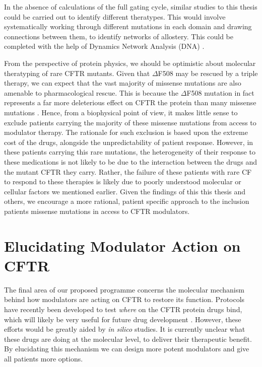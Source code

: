 In the absence of calculations of the full gating cycle, similar studies to this thesis could be carried out to identify different theratypes. This would involve systematically working through different mutations in each domain and drawing connections between them, to identify networks of allostery. This could be completed with the help of Dynamics Network Analysis (DNA) \cite{melo2020}. 

From the perspective of protein physics, we should be optimistic about molecular theratyping of rare CFTR mutants. Given that $\Delta$F508 may be rescued by a triple therapy, we can expect that the vast majority of missense mutations are also amenable to pharmacological rescue. This is because the $\Delta$F508 mutation in fact represents a far more deleterious effect on CFTR the protein than many missense mutations \cite{bahia2021}. Hence, from a biophysical point of view, it makes little sense to exclude patients carrying the majority of these missense mutations from access to modulator therapy. The rationale for such exclusion is based upon the extreme cost of the drugs, alongside the unpredictability of patient response. However, in these patients carrying this rare mutations, the heterogeneity of their response to these medications is not likely to be due to the interaction between the drugs and the mutant CFTR they carry. Rather, the failure of these patients with rare CF to respond to these therapies is likely due to poorly understood molecular or cellular factors we mentioned earlier. Given the findings of this this thesis and others, we encourage a more rational, patient specific approach to the inclusion patients missense mutations in access to CFTR modulators. 


\section{Elucidating Modulator Action on CFTR}

The final area of our proposed programme concerns the molecular mechanism behind how modulators are acting on CFTR to restore its function. Protocols have recently been developed to test \textit{where} on the CFTR protein drugs bind, which will likely be very useful for future drug development \cite{laselva2022}. However, these efforts would be greatly aided by \textit{in silico} studies. It is currently unclear what these drugs are doing at the molecular level, to deliver their therapeutic benefit. By elucidating this mechanism we can design more potent modulators and give all patients more options. 


